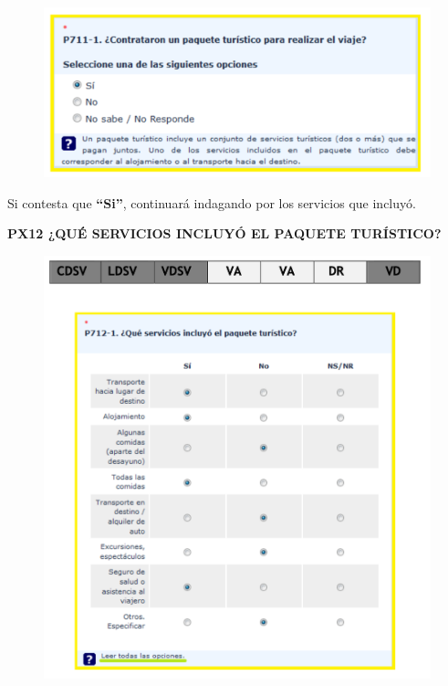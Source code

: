 \documentclass[
  openany]{book}
\begin{document}
\begin{figure}

{\centering \includegraphics[width=1\linewidth]{imagenes/figura6-103} 

}

\end{figure}

Si contesta que \textbf{``Si''}, continuará indagando por los servicios que incluyó.

\textbf{PX12 ¿QUÉ SERVICIOS INCLUYÓ EL PAQUETE TURÍSTICO?}

\begin{figure}

{\centering \includegraphics[width=1\linewidth]{imagenes/figura6-104} 

}

\end{figure}
\end{document}

